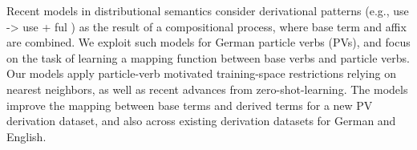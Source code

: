 Recent models in distributional semantics consider derivational patterns (e.g., use -> use + ful ) as the result of a compositional process, where base term and affix are combined. We exploit such models for German particle verbs (PVs), and focus on the task of learning a mapping function between base verbs and particle verbs. Our models apply particle-verb motivated training-space restrictions relying on nearest neighbors, as well as recent advances from zero-shot-learning. The models improve the mapping between base terms and derived terms for a new PV derivation dataset, and also across existing derivation datasets for German and English.
